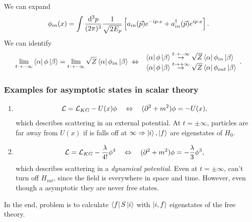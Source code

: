 We can expand
\begin{equation}
	\phi_{in}(x) = \int \frac{\mathrm{d}^3 p}{(2 \pi)^3} \frac{1}{\sqrt{2 E_p}} \left[a_{in}(\vec{p}) e^{- i p\cdot x} +a^{\dagger}_{in} (\vec{p}) e^{i p\cdot x}\right].
\end{equation}
We can identify
\begin{equation}
	\lim_{t\rightarrow - \infty} \bra{\alpha}\phi\ket{\beta} = \lim_{t\rightarrow - \infty} \sqrt{Z} \bra{\alpha}\phi_{in} \ket{\beta} \; \Leftrightarrow\; \begin{array}{lr}
	\bra{\alpha}\phi \ket{\beta} \stackrel{t \rightarrow - \infty}{\rightarrow} \sqrt{Z} \bra{\alpha}\phi_{in} \ket{\beta} \\
	\bra{\alpha}\phi \ket{\beta} \stackrel{t\rightarrow +\infty}{\rightarrow} \sqrt{Z} \bra{\alpha} \phi_{out} \ket{\beta}
	\end{array}.
\end{equation}
\subsubsection{Examples for asymptotic states in scalar theory}
\begin{enumerate}
	\item \begin{equation}
		\mathcal{L} =\mathcal{L}_{KG} - U(x) \phi \quad \Leftrightarrow \quad (\partial^2 +m^2) \phi=- U(x),
	\end{equation}
	which describes scattering in an external potential. At $t=\pm\infty$, particles are far away from $U(x)$ if is falls off at $\infty\Rightarrow \ket{i},\ket{f}$ are eigenstates of $H_0$.
	\item \begin{equation}
		\mathcal{L} = \mathcal{L}_{KG} - \frac{\lambda}{4!} \phi^4 \quad \Leftrightarrow\quad (\partial^2+m^2) \phi= - \frac{\lambda}{3} \phi^3,
	\end{equation}
	which describes scattering in a \emph{dynamical potential}. Even at $t=\pm \infty$, can't turn off $H_{int}$, since the field is everywhere in space and time. However, even though a asymptotic they are never free states.
\end{enumerate}
In the end, problem is to calculate $\bra{f}S\ket{i}$ with $\ket{i,f}$ eigenstates of the free theory. 

